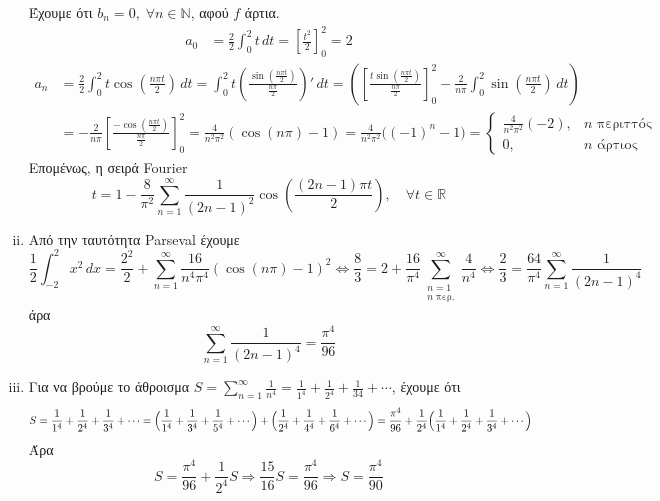\documentclass[a4paper,table]{report}
\begin{document}
\begin{solution}
\begin{enumerate}[i)]
      Έχουμε ότι $ b_{n}=0 , \; \forall n \in \mathbb{N} $, 
      αφού $f$ άρτια.  
      \begin{align*}
        a_{0} &= \frac{2}{2} \int _{0}^{2} t \,{dt} = 
        \left[\frac{t^{2}}{2}\right]_{0}^{2} = 2
      \end{align*}
      \begin{align*}
        a_{n} &= \frac{2}{2} \int _{0}^{2} t \cos{\left(\frac{n \pi t}{2}\right)}
        \,{dt} = \int _{0}^{2} t \left(
        \frac{\sin{(\frac{n \pi t}{2})}}{\frac{n \pi}{2}}\right)' \,{dt} =
        \left(\left[ \frac{t \sin{(\frac{n \pi t}{2})}}{\frac{n \pi}{2}}
          \right]_{0}^{2} - \frac{2}{n \pi}\int _{0}^{2}
        \sin{\left(\frac{n \pi t}{2}\right)} \,{dt}\right) \\
              &= -\frac{2}{n \pi}  
              \left[\frac{-\cos{(\frac{n \pi t}{2})}}{\frac{n \pi}{2}}
              \right]_{0}^{2} = \frac{4}{n^{2} \pi^{2}} (\cos{(n \pi)} - 1) = 
              \frac{4}{n^{2} \pi^{2}} \bigl((-1)^{n}- 1\bigr) = 
              \begin{cases}
                \frac{4}{n^{2} \pi ^{2}} (-2) , & \text{$n$ περιττός} \\
                0, & \text{$n$ άρτιος}
              \end{cases}
      \end{align*}
      Επομένως, η σειρά \textlatin{Fourier}
      \[
        t = 1 - \frac{8}{\pi^{2}} \sum_{n=1}^{\infty} \frac{1}{(2n-1)^{2}}
        \cos{\left(\frac{(2n-1) \pi t}{2}\right)}, 
        \quad \forall t \in \mathbb{R} 
      \] 
    \item Από την ταυτότητα \textlatin{Parseval} έχουμε
      \[
        \frac{1}{2} \int _{-2}^{2} x^{2} \,{dx} = \frac{2^{2}}{2} +
        \sum_{n=1}^{\infty} \frac{16}{n^{4} \pi ^{4}} (\cos{{ (n \pi )-1 }})^{2} 
        \Leftrightarrow \frac{8}{3} = 2 + \frac{16}{\pi ^{4}}
        \sum_{\substack{n=1 \\ n \; \text{περ.}}}^{\infty} 
        \frac{4}{n^{4}}  
        \Leftrightarrow \frac{2}{3} = \frac{64}{\pi ^{4}} \sum_{n=1}^{\infty}
        \frac{1}{(2n-1)^{4}} 
      \] 
      άρα 
      \[
        \sum_{n=1}^{\infty} \frac{1}{(2n-1)^{4}} = \frac{\pi^{4}}{96}
      \]
    \item 
      Για να βρούμε το άθροισμα 
      $ S = \sum_{n=1}^{\infty} \frac{1}{n^{4}} = \frac{1}{1^{4}} + \frac{1}{2^{4}} +
      \frac{1}{3{4}} + \cdots $, έχουμε ότι 
      \[
        S =   \frac{1}{1^{4}} + \frac{1}{2^{4}} + \frac{1}{3^{4}} + \cdots =
        \Bigl(\frac{1}{1^{4}} + \frac{1}{3^{4}} + \frac{1}{5^{4}} + \cdots\Bigr) +
        \Bigl(\frac{1}{2^{4}} + \frac{1}{4^{4}} + \frac{1}{6^{4}} + \cdots\Bigr) 
        = \frac{\pi ^{4}}{96} + 
        \frac{1}{2^{4}} \Bigl(\frac{1}{1^{4}} + \frac{1}{2^{4}} + \frac{1}{3^{4}} +
        \cdots\Bigr) 
      \]
      Άρα
      \[
      S = \frac{\pi ^{4}}{96} + \frac{1}{2^{4}} S \Rightarrow \frac{15}{16}S
      = \frac{\pi ^{4}}{96} \Rightarrow S = \frac{\pi ^{4}}{90}
      \]
  \end{enumerate}
\end{solution} 
\end{document}
